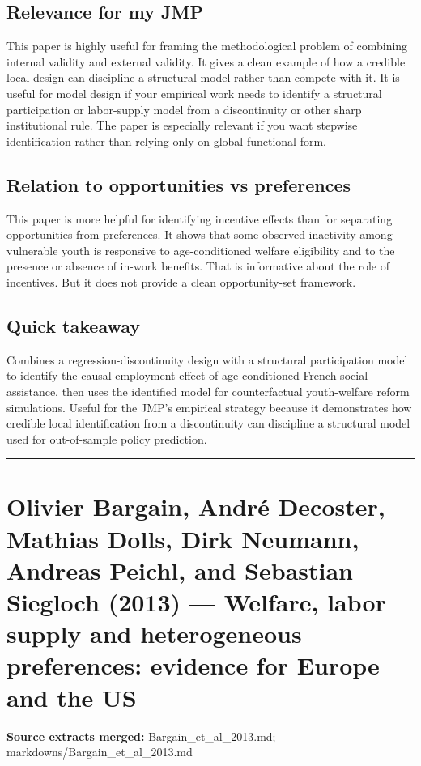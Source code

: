 \documentclass[11pt,a4paper]{article}
\begin{document}
\subsection*{Relevance for my JMP}
This paper is highly useful for framing the methodological problem of combining internal validity and external validity. It gives a clean example of how a credible local design can discipline a structural model rather than compete with it. It is useful for model design if your empirical work needs to identify a structural participation or labor-supply model from a discontinuity or other sharp institutional rule. The paper is especially relevant if you want stepwise identification rather than relying only on global functional form.

\subsection*{Relation to opportunities vs preferences}
This paper is more helpful for identifying incentive effects than for separating opportunities from preferences. It shows that some observed inactivity among vulnerable youth is responsive to age-conditioned welfare eligibility and to the presence or absence of in-work benefits. That is informative about the role of incentives. But it does not provide a clean opportunity-set framework.

\subsection*{Quick takeaway}
Combines a regression-discontinuity design with a structural participation model to identify the causal employment effect of age-conditioned French social assistance, then uses the identified model for counterfactual youth-welfare reform simulations. Useful for the JMP's empirical strategy because it demonstrates how credible local identification from a discontinuity can discipline a structural model used for out-of-sample policy prediction.


\medskip\hrule\medskip

\section*{Olivier Bargain, André Decoster, Mathias Dolls, Dirk Neumann, Andreas Peichl, and Sebastian Siegloch (2013) — Welfare, labor supply and heterogeneous preferences: evidence for Europe and the US}

\textbf{Source extracts merged:} Bargain\_et\_al\_2013.md; markdowns/Bargain\_et\_al\_2013.md
\end{document}
